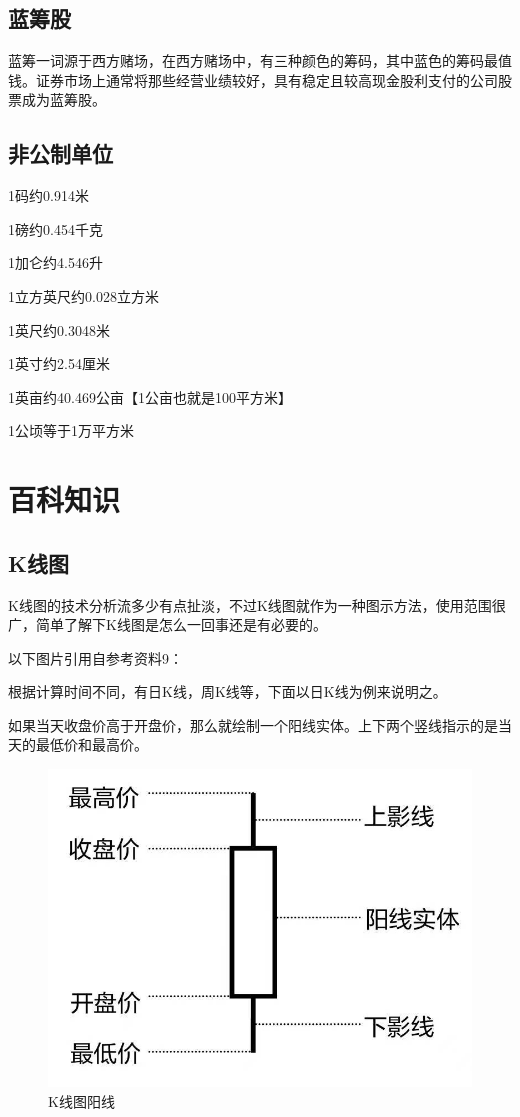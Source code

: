 \documentclass[12pt,oneside]{book}
\begin{document}
\section{蓝筹股}
蓝筹一词源于西方赌场，在西方赌场中，有三种颜色的筹码，其中蓝色的筹码最值钱。证券市场上通常将那些经营业绩较好，具有稳定且较高现金股利支付的公司股票成为蓝筹股。


\section{非公制单位}
1码约0.914米

1磅约0.454千克

1加仑约4.546升

1立方英尺约0.028立方米

1英尺约0.3048米

1英寸约2.54厘米

1英亩约40.469公亩【1公亩也就是100平方米】

1公顷等于1万平方米

\chapter{百科知识}
\section{K线图}
K线图的技术分析流多少有点扯淡，不过K线图就作为一种图示方法，使用范围很广，简单了解下K线图是怎么一回事还是有必要的。

以下图片引用自参考资料9：

根据计算时间不同，有日K线，周K线等，下面以日K线为例来说明之。

如果当天收盘价高于开盘价，那么就绘制一个阳线实体。上下两个竖线指示的是当天的最低价和最高价。

\begin{figure}[H]
\centering
\includegraphics[width=\linewidth ,totalheight=0.95\textheight , keepaspectratio]{K线图阳线.jpg}
\caption{K线图阳线}
\end{figure}
\end{document}
